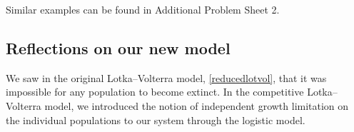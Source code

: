 \documentclass[main.tex]{subfiles}
\begin{document}
%
%
%
%

\begin{do-it-yourself}
Similar examples can be found in Additional Problem Sheet 2.
\end{do-it-yourself}


\subsection{Reflections on our new model}
We saw in the original Lotka--Volterra model, \cref{reducedlotvol}, that it was impossible for any population to become extinct. In the competitive Lotka--Volterra model, we introduced the notion of independent growth limitation on the individual populations to our system through the logistic model. 
\end{document}
